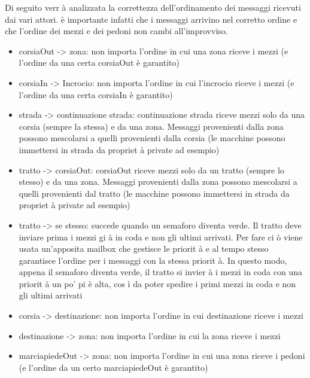 \documentclass{article}
\begin{document}
Di seguito verr \`{a} analizzata la correttezza dell\textquoteright{}ordinamento dei messaggi ricevuti dai vari attori.  \`{e} importante infatti che i messaggi arrivino nel corretto ordine e che l\textquoteright{}ordine dei mezzi e dei pedoni non cambi all\textquoteright{}improvviso.
\begin{itemize}
\item {corsiaOut -\textgreater{} zona:} non importa l\textquoteright{}ordine in cui una zona riceve i mezzi (e l\textquoteright{}ordine da una certa corsiaOut  \`{e} garantito)
\item {corsiaIn -\textgreater{} Incrocio:} non importa l\textquoteright{}ordine in cui l\textquoteright{}incrocio riceve i mezzi (e l\textquoteright{}ordine da una certa corsiaIn  \`{e} garantito)
\item {strada -\textgreater{} continuazione strada:} continuazione strada riceve mezzi solo da una corsia (sempre la stessa) e da una zona. Messaggi provenienti dalla zona possono mescolarsi a quelli provenienti dalla corsia (le macchine possono immettersi in strada da propriet \`{a} private ad esempio)
\item {tratto -\textgreater{} corsiaOut:} corsiaOut riceve mezzi solo da un tratto (sempre lo stesso) e da una zona. Messaggi provenienti dalla zona possono mescolarsi a quelli provenienti dal tratto (le macchine possono immettersi in strada da propriet \`{a} private ad esempio)
\item {tratto -\textgreater{} se stesso:} succede quando un semaforo diventa verde. Il tratto deve inviare prima i mezzi gi \`{a} in coda e non gli ultimi arrivati. Per fare ci \`{o} viene usata un\textquoteright{}apposita mailbox che gestisce le priorit \`{a} e al tempo stesso garantisce l\textquoteright{}ordine per i messaggi con la stessa priorit \`{a}. In questo modo, appena il semaforo diventa verde, il tratto si invier \`{a} i mezzi in coda con una priorit \`{a} un po\textquoteright{} pi \`{e} alta, cos \`{i} da poter spedire i primi mezzi in coda e non gli ultimi arrivati 
\item {corsia -\textgreater{} destinazione:} non importa l\textquoteright{}ordine in cui destinazione riceve i mezzi
\item {destinazione -\textgreater{} zona:} non importa l\textquoteright{}ordine in cui la zona riceve i mezzi
\item {marciapiedeOut -\textgreater{} zona:} non importa l\textquoteright{}ordine in cui una zona riceve i pedoni (e l\textquoteright{}ordine da un certo marciapiedeOut  \`{e} garantito)

\end{itemize}
\end{document}

